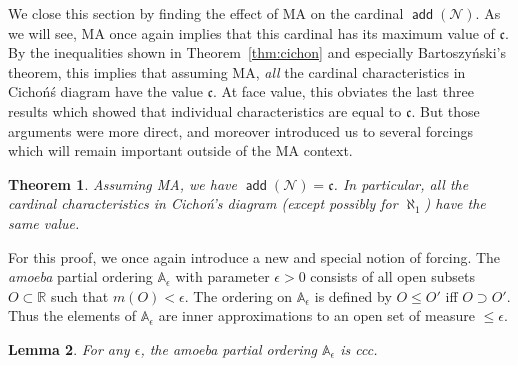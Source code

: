 \documentclass[11pt,oneside]{amsbook}
\newcommand{\R}{\mathbb R}
\newcommand{\Null}{\mathcal N}
\DeclareMathOperator{\add}{\mathsf{add}}
\theoremstyle{definition}
\theoremstyle{plain}
\newtheorem{theorem}{Theorem}[section]
\newtheorem{lemma}[theorem]{Lemma}
\theoremstyle{definition}
\theoremstyle{remark}
\numberwithin{equation}{section}
\numberwithin{figure}{section}
\begin{document}
We close this section by finding the effect of MA on the cardinal $\add(\Null)$. As we will see, MA once again implies that this cardinal has its maximum value of $\mathfrak c$. By the inequalities shown in Theorem~\ref{thm:cichon} and especially Bartoszy\'nski's theorem, this implies that assuming MA, \emph{all} the cardinal characteristics in Cicho\'n\'s diagram have the value $\mathfrak c$. At face value, this obviates the last three results which showed that individual characteristics are equal to $\mathfrak c$. But those arguments were more direct, and moreover introduced us to several forcings which will remain important outside of the MA context.

\begin{theorem}
  \label{thm:ma-addn}
  Assuming MA, we have $\add(\Null)=\mathfrak c$. In particular, all the cardinal characteristics in Cicho\'n's diagram (except possibly for $\aleph_1$) have the same value.
\end{theorem}

For this proof, we once again introduce a new and special notion of forcing. The \emph{amoeba} partial ordering $\mathbb A_\epsilon$ with parameter $\epsilon>0$ consists of all open subsets $O\subset\R$ such that $m(O)<\epsilon$. The ordering on $\mathbb A_\epsilon$ is defined by $O\leq O'$ iff $O\supset O'$. Thus the elements of $\mathbb A_\epsilon$ are inner approximations to an open set of measure $\leq\epsilon$.

\begin{lemma}
  For any $\epsilon$, the amoeba partial ordering $\mathbb A_\epsilon$ is ccc.
\end{lemma}
\end{document}
